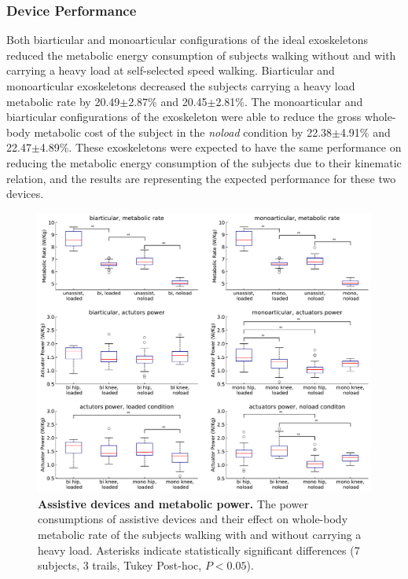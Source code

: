 \documentclass[10pt,letterpaper]{article}
\begin{document}
\subsubsection*{Device Performance}
Both biarticular and monoarticular configurations of the ideal exoskeletons reduced the metabolic energy consumption of subjects walking without and with carrying a heavy load at self-selected speed walking. Biarticular and monoarticular exoskeletons decreased the subjects carrying a heavy load metabolic rate by 20.49$\pm$2.87\% and 20.45$\pm$2.81\%. The monoarticular and biarticular configurations of the exoskeleton were able to reduce the gross whole-body metabolic cost of the subject in the \textit{noload} condition by 22.38$\pm$4.91\% and 22.47$\pm$4.89\%. These exoskeletons were expected to have the same performance on reducing the metabolic energy consumption of the subjects due to their kinematic relation, and the results are representing the expected performance for these two devices.\\
\begin{figure}[ht]   
	\centering
	\includegraphics[width=\linewidth]{Ideal_Exo_MonovsBi_Figures/Paper_Figure_Energy_BoxPlot.pdf}
	\vspace{1mm}
	\caption{\small{\textbf{Assistive devices and metabolic power.} The power consumptions of assistive devices and their effect on whole-body metabolic rate of the subjects walking with and without carrying a heavy load. Asterisks indicate statistically significant differences (7 subjects, 3 trails, Tukey Post-hoc, $P < 0.05$).}}
	\label{Fig_IdealExo_Energy_BoxPlot}
\end{figure}
\end{document}
